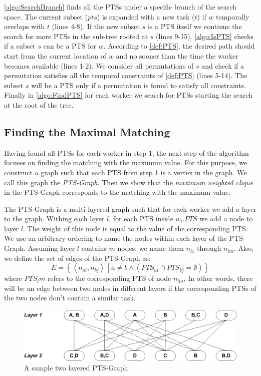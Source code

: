 \cref{algo:SearchBranch} finds all the PTSs under a specific branch of the search space. The current subset ($pts$) is expanded with a new task ($t$) if $w$ temporally overlaps with $t$ (lines 4-8). If the new subset $s$ is a PTS itself we continue the search for more PTSs in the sub-tree rooted at $s$ (lines  9-15). \cref{algo:IsPTS} checks if a subset $s$ can be a PTS for $w$. According to \cref{def:PTS}, the desired path should start from the current location of $w$ and no sooner than the time the worker becomes available (lines  1-2). We consider all permutations of $s$ and check if a permutation satisfies all the temporal constraints of \cref{def:PTS} (lines 5-14). The subset $s$ will be a PTS only if a permutation is found to satisfy all constraints. Finally in \cref{algo:FindPTS} for each worker we search for PTSs starting the search at the root of the tree.
			
\subsection{Finding the Maximal Matching}
\label{subsec:FindMM}
Having found all PTSs for each worker in step 1, the next step of the algorithm focuses on finding the matching with the maximum value. For this purpose, we construct a graph such that each PTS from step 1 is a vertex in the graph. We call this graph the \emph{PTS-Graph}. Then we show that the \emph{maximum weighted clique} in the PTS-Graph corresponds to the matching with the maximum value.

The PTS-Graph is a multi-layered graph such that for each worker we add a layer to the graph. Withing each layer $l$, for each PTS inside $w_l.PTS$ we add a node to layer $l$. The weight of this node is equal to the value of the corresponding PTS. We use an arbitrary ordering to name the nodes within each layer of the PTS-Graph. Assuming layer $l$ contains $m$ nodes, we name them $n_{l1}$ through $n_{lm}$. Also, we define the set of edges of the PTS-Graph as:
\begin{equation}
E = \left\{ \left\langle n_{ai}, n_{bj} \right\rangle \middle | a \neq b \land \left(PTS_{ai} \cap PTS_{bj} = \emptyset \right) \right\}
\end{equation}
where $PTS_lm$ refers to the corresponding PTS of node $n_{lm}$. In other words, there will be an edge between two nodes in different layers if the corresponding PTSs of the two nodes don't contain a similar task.

\begin{figure}[t]
	\centering
	\includegraphics[width = 0.85\columnwidth]{figures/PTS_graph.png}
			\vspace{-0.2cm}
	\caption{A sample two layered PTS-Graph}
	\label{fig:PTS_tree}
			\vspace{-0.2cm}
\end{figure}

